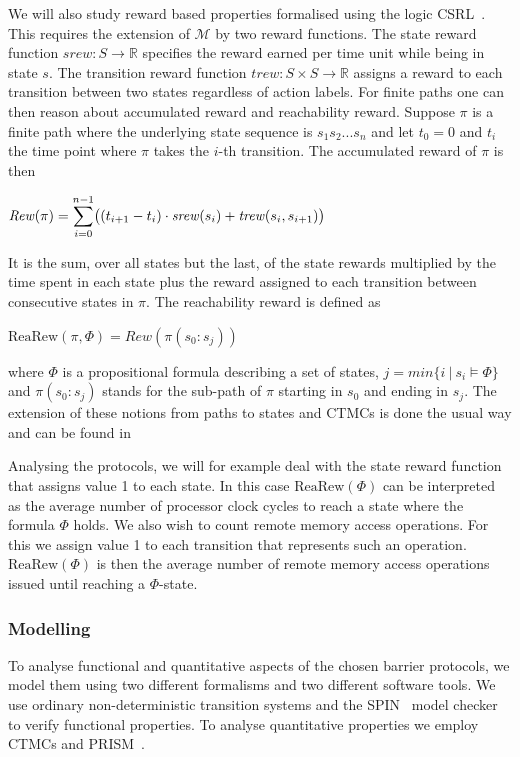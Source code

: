 \documentclass[a4paper, 10pt]{article}
\begin{document}
We will also study reward based properties formalised using the logic CSRL~\cite{bhhk00, knp07}.
This requires the extension of $\mathcal{M}$ by two reward functions. The state reward function $\mathit{srew} : S \rightarrow \mathbb{R}$ specifies the reward earned per time unit while being in state $s$. The transition reward function $\mathit{trew} : S \times S \rightarrow \mathbb{R}$ assigns a reward to each transition between two states regardless of action labels.
For finite paths one can then reason about accumulated reward and reachability reward.
Suppose $\pi$ is a finite path where the underlying state sequence is $s_1 s_2 ...s_n$ and let $t_0 = 0$ and $t_i$ the time point where $\pi$ takes the $i$-th transition.
The accumulated reward of $\pi$ is then
\begin{center}
	$\mathit{Rew}(\pi) = \mathlarger{\sum}\limits_{i=0}^{n-1} \big( (t_{i+1} - t_i) \cdot \mathit{srew}(s_i) + \mathit{trew}(s_i, s_{i+1}) \big)$
\end{center}
It is the sum, over all states but the last, of the state rewards multiplied by the time spent in each state plus the reward assigned to each transition between consecutive states in $\pi$.
The reachability reward is defined as
\begin{center}
	$\mathrm{ReaRew}(\pi, \Phi) = \mathit{Rew}(\pi(s_0:s_j))$
\end{center}
where $\Phi$ is a propositional formula describing a set of states, $j = min \{ i~|~s_i \models \Phi \}$ and  $\pi(s_0:s_j)$ stands for the sub-path of $\pi$ starting in $s_0$ and ending in $s_j$.
The extension of these notions from paths to states and CTMCs is done the usual way and can be found in \cite{bhhk03}

Analysing the protocols, we will for example deal with the state reward function that assigns value 1 to each state. In this case $\mathrm{ReaRew}(\Phi)$ can be interpreted as the average number of processor clock cycles to reach a state where the formula $\Phi$ holds.
We also wish to count remote memory access operations. For this we assign value 1 to each transition that represents such an operation. $\mathrm{ReaRew}(\Phi)$ is then the average number of remote memory access operations issued until reaching a $\Phi$-state.

\subsubsection{Modelling}
\label{sssec:analysis-modelchecking-modelling}
To analyse functional and quantitative aspects of the chosen barrier protocols, we model them using two different formalisms and two different software tools. We use ordinary non-deterministic transition systems and the SPIN~\cite{spin, hol97} model checker to verify functional properties. To analyse quantitative properties we employ CTMCs and PRISM~\cite{prism, knp09}.
\end{document}
